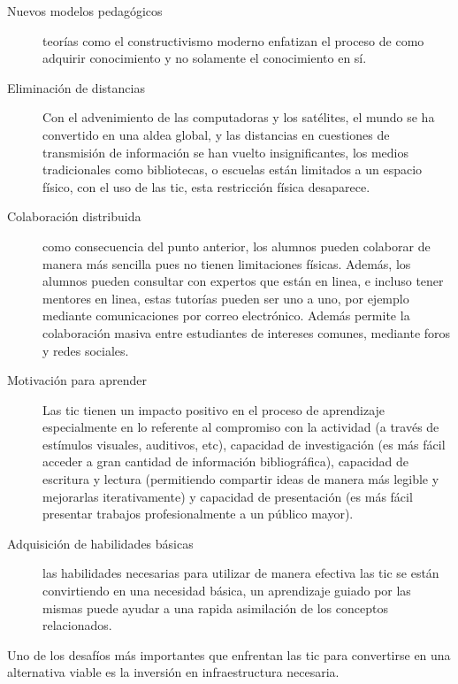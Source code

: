 \begin{description}

    \item[Nuevos modelos pedagógicos] teorías como el constructivismo moderno
	    enfatizan el proceso de como adquirir conocimiento y no solamente el
	    conocimiento en sí.

    \item[Eliminación de distancias] Con el advenimiento de las computadoras y los
	    satélites, el mundo se ha convertido en una aldea global, y las
	    distancias en cuestiones de transmisión de información se han vuelto
	    insignificantes\cite{mohammed2013information}, los medios
	    tradicionales como bibliotecas, o escuelas están limitados a un
	    espacio físico, con el uso de las \Gls{tic}, esta restricción
	    física desaparece\cite{tinio:ict}.

    \item[Colaboración distribuida] como consecuencia del punto anterior, los
	    alumnos pueden colaborar de manera más sencilla pues no tienen
	    limitaciones físicas. Además, los alumnos pueden consultar con
	    expertos que están en linea, e incluso tener mentores en linea,
	    estas tutorías pueden ser uno a uno, por ejemplo mediante
	    comunicaciones por correo electrónico. Además permite la
	    colaboración masiva entre estudiantes de intereses comunes, mediante
	    foros y redes sociales\cite{unesco:ict}.

    \item[Motivación para aprender] Las \Gls{tic} tienen un impacto positivo en
	    el proceso de aprendizaje especialmente en lo referente al
	    compromiso con la actividad (a través de estímulos visuales,
	    auditivos, etc), capacidad de investigación (es más fácil acceder a
	    gran cantidad de información bibliográfica), capacidad de escritura
	    y lectura (permitiendo compartir ideas de manera más legible y
	    mejorarlas iterativamente) y capacidad de presentación (es más fácil
	    presentar trabajos profesionalmente a un público
	    mayor)\cite{passey2004motivational}\cite{egenfeldt2007third}.

    \item[Adquisición de habilidades básicas] las habilidades necesarias para
	    utilizar de manera efectiva las \Gls{tic} se están convirtiendo en
	    una necesidad básica, un aprendizaje guiado por las mismas puede
	    ayudar a una rapida asimilación de los conceptos relacionados.

\end{description}

Uno de los desafíos más importantes que enfrentan las \Gls{tic} para convertirse
en una alternativa viable es la inversión en infraestructura
necesaria\cite{unesco:ict}. 



%
 


